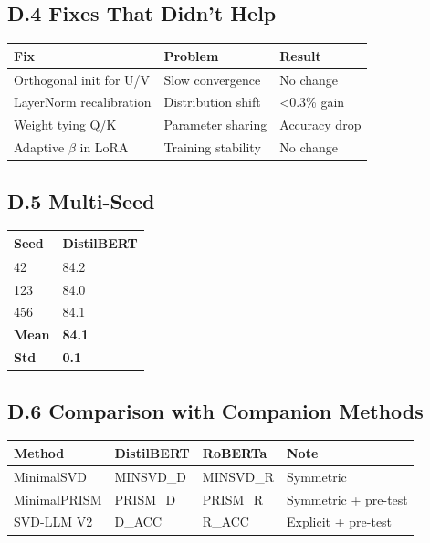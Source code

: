 \subsection{D.4 Fixes That Didn't Help}

\begin{table}[H]
\centering
\small
\begin{tabular}{lll}
\toprule
\textbf{Fix} & \textbf{Problem} & \textbf{Result} \\
\midrule
Orthogonal init for U/V & Slow convergence & No change \\
LayerNorm recalibration & Distribution shift & <0.3\% gain \\
Weight tying Q/K & Parameter sharing & Accuracy drop \\
Adaptive $\beta$ in LoRA & Training stability & No change \\
\bottomrule
\end{tabular}
\end{table}

\subsection{D.5 Multi-Seed}

\begin{table}[H]
\centering
\small
\begin{tabular}{ll}
\toprule
\textbf{Seed} & \textbf{DistilBERT} \\
\midrule
42 & 84.2 \\
123 & 84.0 \\
456 & 84.1 \\
\textbf{Mean} & \textbf{84.1} \\
\textbf{Std} & \textbf{0.1} \\
\bottomrule
\end{tabular}
\end{table}

\subsection{D.6 Comparison with Companion Methods}

\begin{table}[H]
\centering
\small
\begin{tabular}{llll}
\toprule
\textbf{Method} & \textbf{DistilBERT} & \textbf{RoBERTa} & \textbf{Note} \\
\midrule
MinimalSVD & {{MINSVD\_D}} & {{MINSVD\_R}} & Symmetric \\
MinimalPRISM & {{PRISM\_D}} & {{PRISM\_R}} & Symmetric + pre-test \\
SVD-LLM V2 & {{D\_ACC}} & {{R\_ACC}} & Explicit + pre-test \\
\bottomrule
\end{tabular}
\end{table}

